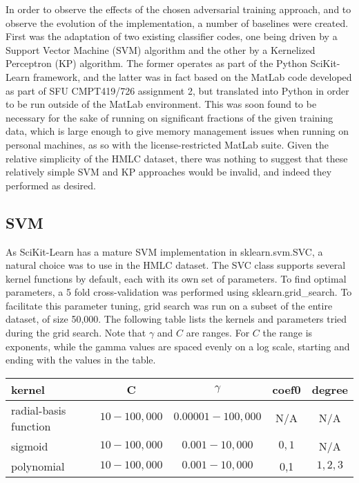 \documentclass{article} %
\begin{document}
In order to observe the effects of the chosen adversarial training approach, and to observe the evolution of the implementation, a number of baselines were created. First was the adaptation of two existing classifier codes, one being driven by a Support Vector Machine (SVM) algorithm and the other by a Kernelized Perceptron (KP) algorithm. The former operates as part of the Python SciKit-Learn framework, and the latter was in fact based on the MatLab code developed as part of SFU CMPT419/726 assignment 2, but translated into Python in order to be run outside of the MatLab environment. This was soon found to be necessary for the sake of running on significant fractions of the given training data, which is large enough to give memory management issues when running on personal machines, as so with the license-restricted MatLab suite. Given the relative simplicity of the HMLC dataset, there was nothing to suggest that these relatively simple SVM and KP approaches would be invalid, and indeed they performed as desired.

\subsection{SVM}
As SciKit-Learn has a mature SVM implementation in sklearn.svm.SVC, a natural choice was to use in the HMLC dataset. The SVC class supports several kernel functions by default, each with its own set of parameters. To find optimal parameters, a 5 fold cross-validation was performed using sklearn.grid\_search. To facilitate this parameter tuning, grid search was run on a subset of the entire dataset, of size 50,000. The following table lists the kernels and parameters tried during the grid search. Note that $\gamma$ and $C$ are ranges. For $C$ the range is exponents, while the gamma values are spaced evenly on a log scale, starting and ending with the values in the table.

\begin{center}
\begin{tabular}{|l|c|c|c|c|}
  \hline
  kernel & C & $\gamma$ & coef0 & degree\\
  \hline
  radial-basis function&$10-100,000$&$0.00001-100,000$& N/A&N/A\\
  \hline
  sigmoid& $10-100,000$&$0.001-10,000$&$0,1$& N/A\\
  \hline
  polynomial &$10-100,000$&$0.001-10,000$&0,1&$1,2,3$\\
  \hline
\end{tabular}
\end{center}
\end{document}
